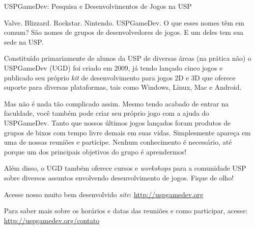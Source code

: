 \begin{subsecao}{USPGameDev: Pesquisa e Desenvolvimentos de Jogos na USP}

Valve. Blizzard. Rockstar. Nintendo. USPGameDev. O que esses nomes têm em comum?
São nomes de grupos de desenvolvedores de jogos. E um deles tem sua sede na USP.

Constituído primariamente de alunos da USP de diversas áreas (na prática não) o 
USPGameDev (UGD) foi criado em 2009, já tendo lançado cinco jogos e 
publicado seu próprio \textit{kit} de desenvolvimento para jogos 2D e 3D que 
oferece suporte para diversas plataformas, tais como Windows, Linux, Mac e Android. 

Mas não é nada tão complicado assim. Mesmo tendo acabado de entrar na faculdade,
você também pode criar seu próprio jogo com a ajuda do USPGameDev. Tanto que nossos
últimos jogos lançados foram produtos de grupos de bixos com tempo livre demais em
suas vidas. Simplesmente apareça em uma de nossas reuniões e participe. Nenhum
conhecimento é necessário, até porque um dos principais objetivos do grupo é
aprendermos!

Além disso, o UGD também oferece cursos e \textit{workshops} para a comunidade USP
sobre diversos assuntos envolvendo desenvolvimento de jogos. Fique de olho!

Acesse nosso muito bem desenvolvido \textit{site}: 
\url{http://uspgamedev.org}

Para saber mais sobre os horários e datas das reuniões e como participar, acesse: 
\url{http://uspgamedev.org/contato}

\end{subsecao}

